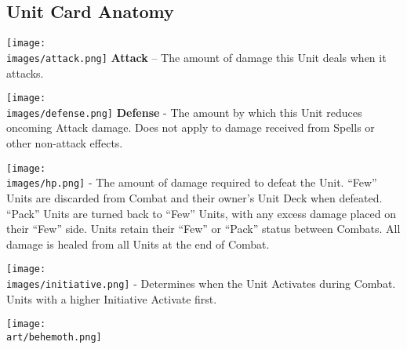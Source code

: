 \begin{multicols}{2}
\subsection*{Unit Card Anatomy}

\vspace{0pt}

\texttt{[image: \\images/attack.png]} \textbf{Attack} – The amount of damage this Unit deals when it attacks.\par
\texttt{[image: \\images/defense.png]} \textbf{Defense} - The amount by which this Unit reduces oncoming Attack damage.
Does not apply to damage received from Spells or other non-attack effects.\par
\texttt{[image: \\images/hp.png]} \textbf{} - The amount of damage required to defeat the Unit.
``Few'' Units are discarded from Combat and their owner's Unit Deck when defeated.
``Pack'' Units are turned back to ``Few'' Units, with any excess damage placed on their ``Few'' side.
Units retain their ``Few'' or ``Pack'' status between Combats.
All damage is healed from all Units at the end of Combat.\par
\texttt{[image: \\images/initiative.png]}{} - Determines when the Unit Activates during Combat.
Units with a higher Initiative Activate first.

\vfill
\hspace{-2em}
\texttt{[image: \\art/behemoth.png]}


\end{multicols}
